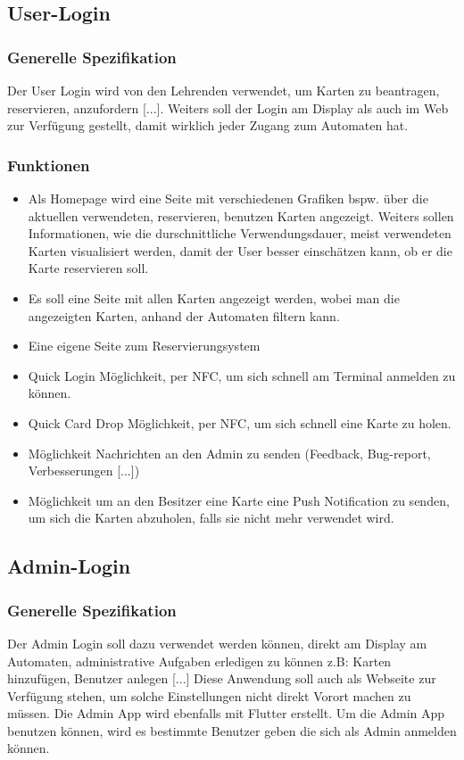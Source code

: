 \documentclass[a4paper]{article}
\begin{document}
\subsection{User-Login}
\subsubsection{Generelle Spezifikation}
Der User Login wird von den Lehrenden verwendet, um Karten zu beantragen, reservieren, anzufordern [...]. Weiters soll der Login am Display als auch im Web zur Verfügung gestellt, damit wirklich jeder Zugang zum Automaten hat. 

\subsubsection{Funktionen}
\begin{itemize}
  \item Als Homepage wird eine Seite mit verschiedenen Grafiken  bspw. über die aktuellen verwendeten, reservieren, benutzen Karten angezeigt. Weiters sollen Informationen, wie die durschnittliche Verwendungsdauer, meist verwendeten Karten visualisiert werden, damit der User besser einschätzen kann, ob er die Karte reservieren soll.
  \item Es soll eine Seite mit allen Karten angezeigt werden, wobei man die angezeigten Karten, anhand der Automaten filtern kann.
  \item Eine eigene Seite zum Reservierungsystem
  \item Quick Login Möglichkeit, per NFC, um sich schnell am Terminal anmelden zu können. 
  \item Quick Card Drop Möglichkeit, per NFC, um sich schnell eine Karte zu holen.
  \item Möglichkeit Nachrichten an den Admin zu senden (Feedback, Bug-report, Verbesserungen [...])
  \item Möglichkeit um an den Besitzer eine Karte eine Push Notification zu senden, um sich die Karten abzuholen, falls sie nicht mehr verwendet wird.
\end{itemize}

\subsection{Admin-Login}
\subsubsection{Generelle Spezifikation}
Der Admin Login soll dazu verwendet werden können, direkt am Display am Automaten, administrative Aufgaben erledigen zu können z.B: Karten hinzufügen, Benutzer anlegen [...] Diese Anwendung soll auch als Webseite zur Verfügung stehen, um solche Einstellungen nicht direkt Vorort machen zu müssen. Die Admin App wird ebenfalls mit Flutter erstellt. Um die Admin App benutzen können, wird es bestimmte Benutzer geben die sich als Admin anmelden können. 
\end{document}
